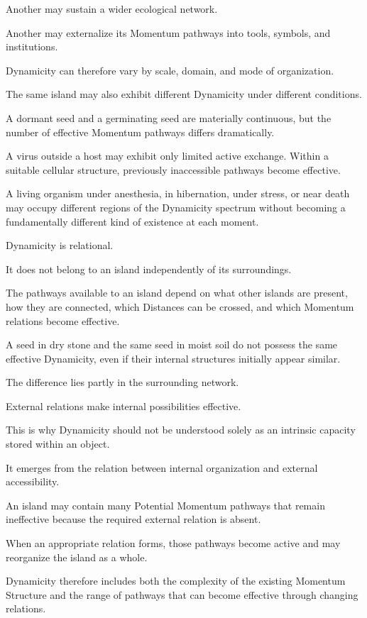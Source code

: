 Another may sustain a wider ecological network.

Another may externalize its Momentum pathways into tools, symbols, and institutions.

Dynamicity can therefore vary by scale, domain, and mode of organization.

The same island may also exhibit different Dynamicity under different conditions.

A dormant seed and a germinating seed are materially continuous, but the number of effective Momentum pathways differs dramatically.

A virus outside a host may exhibit only limited active exchange. Within a suitable cellular structure, previously inaccessible pathways become effective.

A living organism under anesthesia, in hibernation, under stress, or near death may occupy different regions of the Dynamicity spectrum without becoming a fundamentally different kind of existence at each moment.

Dynamicity is relational.

It does not belong to an island independently of its surroundings.

The pathways available to an island depend on what other islands are present, how they are connected, which Distances can be crossed, and which Momentum relations become effective.

A seed in dry stone and the same seed in moist soil do not possess the same effective Dynamicity, even if their internal structures initially appear similar.

The difference lies partly in the surrounding network.

External relations make internal possibilities effective.

This is why Dynamicity should not be understood solely as an intrinsic capacity stored within an object.

It emerges from the relation between internal organization and external accessibility.

An island may contain many Potential Momentum pathways that remain ineffective because the required external relation is absent.

When an appropriate relation forms, those pathways become active and may reorganize the island as a whole.

Dynamicity therefore includes both the complexity of the existing Momentum Structure and the range of pathways that can become effective through changing relations.

